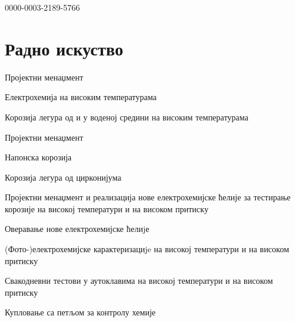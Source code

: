 \documentclass[11pt, a4paper, notitlepage]{article}
\begin{document}
\selectfont
\pagestyle{empty}
	\newpage

	
	
	{}
	{}
	{}
	{0000-0003-2189-5766}

	\section*{Радно искуство}

	\begin{jobdetails}[OT2]
		\item Пројектни менаџмент
 		\item Електрохемија на високим температурама
		\item Корозија легура од  и  у воденој средини на високим температурама
	\end{jobdetails}
		
	\begin{jobdetails}[OT2]
		\item Пројектни менаџмент
		\item Напонска корозија 
		\item Корозија легура од цирконијума
	\end{jobdetails}

	\begin{jobdetails}[OT2]
		\item Пројектни менаџмент и реализација нове електрохемијске ћелије за тестирање корозије на високој температури и на високом притиску
		\item Оверавање нове електрохемијске ћелиjе
		\item (Фото-)електрохемијске карактеризациje на високој температури и на високом притиску
		\item Свакодневни тестови у аутоклавима на високој температури и на високом притиску
		\item Купловање са петљом за контролу хемије
	\end{jobdetails}
	
\end{document}

